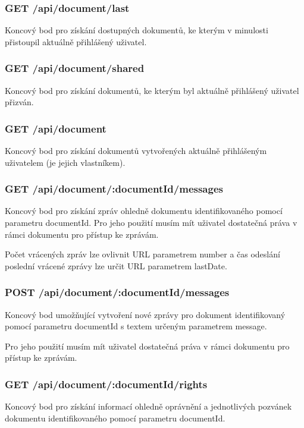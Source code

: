 \subsubsection{GET /api/document/last}

Koncový bod pro získání dostupných dokumentů, ke kterým v minulosti přistoupil aktuálně přihlášený uživatel.

\subsubsection{GET /api/document/shared}

Koncový bod pro získání dokumentů, ke kterým byl aktuálně přihlášený uživatel přizván.

\subsubsection{GET /api/document}

Koncový bod pro získání dokumentů vytvořených aktuálně přihlášeným uživatelem (je jejich vlastníkem).

\subsubsection{GET /api/document/:documentId/messages}

Koncový bod pro získání zpráv ohledně dokumentu identifikovaného pomocí parametru documentId.
Pro jeho použití musím mít uživatel dostatečná práva v rámci dokumentu pro přístup ke zprávám.

Počet vrácených zpráv lze ovlivnit \gls{URL} parametrem number a čas odeslání poslední vrácené zprávy lze určit \gls{URL} parametrem lastDate.

\subsubsection{POST /api/document/:documentId/messages}
Koncový bod umožňující vytvoření nové zprávy pro dokument identifikovaný pomocí parametru documentId s textem určeným parametrem message.

Pro jeho použití musím mít uživatel dostatečná práva v rámci dokumentu pro přístup ke zprávám.

\subsubsection{GET /api/document/:documentId/rights}

Koncový bod pro získání informací ohledně oprávnění a jednotlivých pozvánek dokumentu identifikovaného pomocí parametru documentId.


